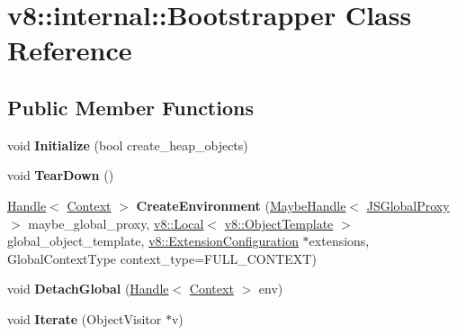 \hypertarget{classv8_1_1internal_1_1_bootstrapper}{}\section{v8\+:\+:internal\+:\+:Bootstrapper Class Reference}
\label{classv8_1_1internal_1_1_bootstrapper}
\subsection*{Public Member Functions}
\begin{DoxyCompactItemize}
\item 
void {\bfseries Initialize} (bool create\+\_\+heap\+\_\+objects)\hypertarget{classv8_1_1internal_1_1_bootstrapper_a786cfec628cdd9049ac48c335d5ba5a0}{}\label{classv8_1_1internal_1_1_bootstrapper_a786cfec628cdd9049ac48c335d5ba5a0}

\item 
void {\bfseries Tear\+Down} ()\hypertarget{classv8_1_1internal_1_1_bootstrapper_af547adb8e8d297f7009a1207e36dcd3f}{}\label{classv8_1_1internal_1_1_bootstrapper_af547adb8e8d297f7009a1207e36dcd3f}

\item 
\hyperlink{classv8_1_1internal_1_1_handle}{Handle}$<$ \hyperlink{classv8_1_1internal_1_1_context}{Context} $>$ {\bfseries Create\+Environment} (\hyperlink{classv8_1_1internal_1_1_maybe_handle}{Maybe\+Handle}$<$ \hyperlink{classv8_1_1internal_1_1_j_s_global_proxy}{J\+S\+Global\+Proxy} $>$ maybe\+\_\+global\+\_\+proxy, \hyperlink{classv8_1_1_local}{v8\+::\+Local}$<$ \hyperlink{classv8_1_1_object_template}{v8\+::\+Object\+Template} $>$ global\+\_\+object\+\_\+template, \hyperlink{classv8_1_1_extension_configuration}{v8\+::\+Extension\+Configuration} $\ast$extensions, Global\+Context\+Type context\+\_\+type=F\+U\+L\+L\+\_\+\+C\+O\+N\+T\+E\+XT)\hypertarget{classv8_1_1internal_1_1_bootstrapper_a06ad95208319d1684b232e2df62e098d}{}\label{classv8_1_1internal_1_1_bootstrapper_a06ad95208319d1684b232e2df62e098d}

\item 
void {\bfseries Detach\+Global} (\hyperlink{classv8_1_1internal_1_1_handle}{Handle}$<$ \hyperlink{classv8_1_1internal_1_1_context}{Context} $>$ env)\hypertarget{classv8_1_1internal_1_1_bootstrapper_a2aa410105a62de50a1dbc1e045b001e0}{}\label{classv8_1_1internal_1_1_bootstrapper_a2aa410105a62de50a1dbc1e045b001e0}

\item 
void {\bfseries Iterate} (Object\+Visitor $\ast$v)\hypertarget{classv8_1_1internal_1_1_bootstrapper_a79f7fb8e74caaf13700f3a437741b4a3}{}\label{classv8_1_1internal_1_1_bootstrapper_a79f7fb8e74caaf13700f3a437741b4a3}


\end{DoxyCompactItemize}
